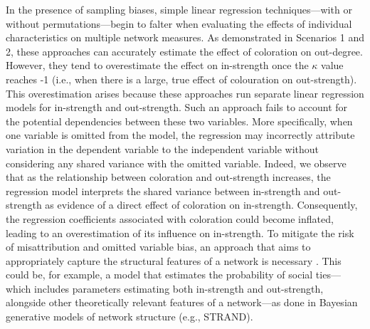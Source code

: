 \documentclass[Afour,sageh,times]{sagej}
\begin{document}
In the presence of sampling biases, simple linear regression techniques---with or without permutations---begin to falter when evaluating the effects of individual characteristics on multiple network measures. As demonstrated in Scenarios 1 and 2, these approaches can accurately estimate the effect of coloration on out-degree. However, they tend to overestimate the effect on in-strength once the $\kappa$ value reaches -1 (i.e., when there is a large, true effect of colouration on out-strength). This overestimation arises because these approaches run separate linear regression models for in-strength and out-strength. Such an approach fails to account for the potential dependencies between these two variables. 
More specifically, when one variable is omitted from the model, the regression may incorrectly attribute variation in the dependent variable to the independent variable without considering any shared variance with the omitted variable. Indeed, we observe that as the relationship between coloration and out-strength increases, the regression model interprets the shared variance between in-strength and out-strength as evidence of a direct effect of coloration on in-strength. Consequently, the regression coefficients associated with coloration could become inflated, leading to an overestimation of its influence on in-strength. To mitigate the risk of misattribution and omitted variable bias, an approach that aims to appropriately capture the structural features of a network is necessary \citep{snijders2011statistical}. This could be, for example, a model that estimates the probability of social ties---which includes parameters estimating both in-strength and out-strength, alongside other theoretically relevant features of a network---as done in Bayesian generative models of network structure (e.g., STRAND).
\end{document}
